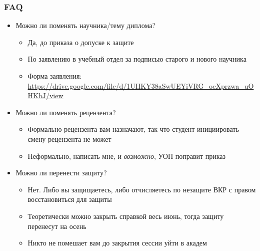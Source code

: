 \documentclass[xetex,mathserif,serif]{beamer}
\begin{document}
    \begin{frame}
        \frametitle{FAQ}
        \begin{itemize}
            \item Можно ли поменять научника/тему диплома?
            \begin{itemize}
                \item Да, до приказа о допуске к защите
                \item По заявлению в учебный отдел за подписью старого и нового научника 
                \item Форма заявления: \url{https://drive.google.com/file/d/1UHKY38aSwUEYiVRG_oeXprzwa_uOHKbJ/view}
            \end{itemize}
            \item Можно ли поменять рецензента?
            \begin{itemize}
                \item Формально рецензента вам назначают, так что студент инициировать смену рецензента не может
                \item Неформально, написать мне, и \textit{возможно}, УОП поправит приказ
            \end{itemize}
            \item Можно ли перенести защиту?
            \begin{itemize}
                \item Нет. Либо вы защищаетесь, либо отчисляетесь по незащите ВКР с правом восстановиться для защиты
                \item Теоретически можно закрыть справкой весь июнь, тогда защиту перенесут на осень
                \item Никто не помешает вам до закрытия сессии уйти в академ
            \end{itemize}
        \end{itemize}
    \end{frame}
\end{document}
